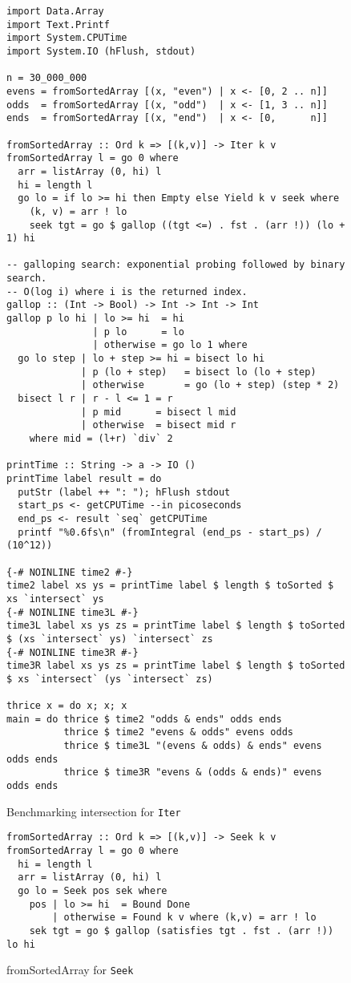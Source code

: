 \documentclass[acmsmall,screen,review,anonymous,dvipsnames,svgnames]{acmart}
\newcommand\hask[1]{\texttt{#1}}
\begin{document}

\begin{figure}
  \begin{verbatim}
import Data.Array
import Text.Printf
import System.CPUTime
import System.IO (hFlush, stdout)

n = 30_000_000
evens = fromSortedArray [(x, "even") | x <- [0, 2 .. n]]
odds  = fromSortedArray [(x, "odd")  | x <- [1, 3 .. n]]
ends  = fromSortedArray [(x, "end")  | x <- [0,      n]]

fromSortedArray :: Ord k => [(k,v)] -> Iter k v
fromSortedArray l = go 0 where
  arr = listArray (0, hi) l
  hi = length l
  go lo = if lo >= hi then Empty else Yield k v seek where
    (k, v) = arr ! lo
    seek tgt = go $ gallop ((tgt <=) . fst . (arr !)) (lo + 1) hi

-- galloping search: exponential probing followed by binary search.
-- O(log i) where i is the returned index.
gallop :: (Int -> Bool) -> Int -> Int -> Int
gallop p lo hi | lo >= hi  = hi
               | p lo      = lo
               | otherwise = go lo 1 where
  go lo step | lo + step >= hi = bisect lo hi
             | p (lo + step)   = bisect lo (lo + step)
             | otherwise       = go (lo + step) (step * 2)
  bisect l r | r - l <= 1 = r
             | p mid      = bisect l mid
             | otherwise  = bisect mid r
    where mid = (l+r) `div` 2

printTime :: String -> a -> IO ()
printTime label result = do
  putStr (label ++ ": "); hFlush stdout
  start_ps <- getCPUTime --in picoseconds
  end_ps <- result `seq` getCPUTime
  printf "%0.6fs\n" (fromIntegral (end_ps - start_ps) / (10^12))

{-# NOINLINE time2 #-}
time2 label xs ys = printTime label $ length $ toSorted $ xs `intersect` ys
{-# NOINLINE time3L #-}
time3L label xs ys zs = printTime label $ length $ toSorted $ (xs `intersect` ys) `intersect` zs
{-# NOINLINE time3R #-}
time3R label xs ys zs = printTime label $ length $ toSorted $ xs `intersect` (ys `intersect` zs)

thrice x = do x; x; x
main = do thrice $ time2 "odds & ends" odds ends
          thrice $ time2 "evens & odds" evens odds
          thrice $ time3L "(evens & odds) & ends" evens odds ends
          thrice $ time3R "evens & (odds & ends)" evens odds ends
  \end{verbatim}
  \caption{Benchmarking intersection for \hask{Iter}}
  \label{fig:iter-benchmark}
\end{figure}

\begin{figure}
  \begin{verbatim}
fromSortedArray :: Ord k => [(k,v)] -> Seek k v
fromSortedArray l = go 0 where
  hi = length l
  arr = listArray (0, hi) l
  go lo = Seek pos sek where
    pos | lo >= hi  = Bound Done
        | otherwise = Found k v where (k,v) = arr ! lo
    sek tgt = go $ gallop (satisfies tgt . fst . (arr !)) lo hi
  \end{verbatim}
  \caption{fromSortedArray for \hask{Seek}}
  \label{fig:seek-fromsortedarray}
\end{figure}
\end{document}
